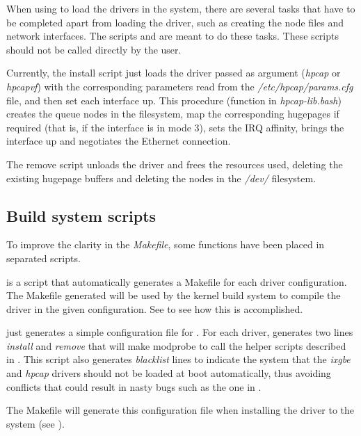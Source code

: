 \documentclass[oneside]{hpman}
\begin{document}
When using  to load the drivers in the system, there are several tasks that have to be completed apart from loading the driver, such as creating the node files and network interfaces. The scripts  and  are meant to do these tasks. These scripts should not be called directly by the user.

Currently, the install script just loads the driver passed as argument (\textit{hpcap} or \textit{hpcapvf}) with the corresponding parameters read from the \textit{/etc/hpcap/params.cfg} file, and then set each interface up. This procedure (function  in \textit{hpcap-lib.bash}) creates the queue nodes in the  filesystem, map the corresponding hugepages if required (that is, if the interface is in mode 3), sets the IRQ affinity, brings the interface up and negotiates the Ethernet connection.

The remove script unloads the driver and frees the resources used, deleting the existing hugepage buffers and deleting the nodes in the \textit{/dev/} filesystem.

\subsection{Build system scripts}

To improve the clarity in the \textit{Makefile}, some functions have been placed in separated scripts.

 is a script that automatically generates a Makefile for each driver configuration. The Makefile generated will be used by the kernel build system to compile the driver in the given configuration. See  to see how this is accomplished.

 just generates a simple configuration file for . For each driver, generates two lines \textit{install} and \textit{remove} that will make modprobe to call the helper scripts described in . This script also generates \textit{blacklist} lines to indicate the system that the \textit{ixgbe} and \textit{hpcap} drivers should not be loaded at boot automatically, thus avoiding conflicts that could result in nasty bugs such as the one in .

The Makefile will generate this configuration file when installing the driver to the system (see ).

\printindex



\end{document}
